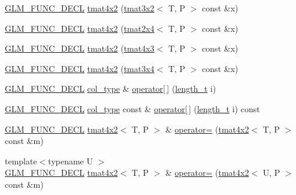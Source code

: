 \begin{DoxyCompactItemize}
\item 
\hyperlink{setup_8hpp_ab2d052de21a70539923e9bcbf6e83a51}{G\+L\+M\+\_\+\+F\+U\+N\+C\+\_\+\+D\+E\+CL} \hyperlink{structglm_1_1detail_1_1tmat4x2_adbb464ba1329c45ae931b2825114d6cf}{tmat4x2} (\hyperlink{structglm_1_1detail_1_1tmat3x2}{tmat3x2}$<$ T, P $>$ const \&x)
\item 
\hyperlink{setup_8hpp_ab2d052de21a70539923e9bcbf6e83a51}{G\+L\+M\+\_\+\+F\+U\+N\+C\+\_\+\+D\+E\+CL} \hyperlink{structglm_1_1detail_1_1tmat4x2_abfac9500ea47ed389da5d877b7b7d716}{tmat4x2} (\hyperlink{structglm_1_1detail_1_1tmat2x4}{tmat2x4}$<$ T, P $>$ const \&x)
\item 
\hyperlink{setup_8hpp_ab2d052de21a70539923e9bcbf6e83a51}{G\+L\+M\+\_\+\+F\+U\+N\+C\+\_\+\+D\+E\+CL} \hyperlink{structglm_1_1detail_1_1tmat4x2_a0f0e6e3e2d0a7bc9d9979a132c410298}{tmat4x2} (\hyperlink{structglm_1_1detail_1_1tmat4x3}{tmat4x3}$<$ T, P $>$ const \&x)
\item 
\hyperlink{setup_8hpp_ab2d052de21a70539923e9bcbf6e83a51}{G\+L\+M\+\_\+\+F\+U\+N\+C\+\_\+\+D\+E\+CL} \hyperlink{structglm_1_1detail_1_1tmat4x2_a810689bea267f9f6fc548ad4e237a2a3}{tmat4x2} (\hyperlink{structglm_1_1detail_1_1tmat3x4}{tmat3x4}$<$ T, P $>$ const \&x)
\item 
\hyperlink{setup_8hpp_ab2d052de21a70539923e9bcbf6e83a51}{G\+L\+M\+\_\+\+F\+U\+N\+C\+\_\+\+D\+E\+CL} \hyperlink{structglm_1_1detail_1_1tmat4x2_a7ff0997d9fa4f93eba8a6530ca2cd3f7}{col\+\_\+type} \& \hyperlink{structglm_1_1detail_1_1tmat4x2_a63321d20fd080a74dbd14953d339d6fc}{operator\mbox{[}$\,$\mbox{]}} (\hyperlink{namespaceglm_a090a0de2260835bee80e71a702492ed9}{length\+\_\+t} i)
\item 
\hyperlink{setup_8hpp_ab2d052de21a70539923e9bcbf6e83a51}{G\+L\+M\+\_\+\+F\+U\+N\+C\+\_\+\+D\+E\+CL} \hyperlink{structglm_1_1detail_1_1tmat4x2_a7ff0997d9fa4f93eba8a6530ca2cd3f7}{col\+\_\+type} const  \& \hyperlink{structglm_1_1detail_1_1tmat4x2_aa2d48c1cd14557209c89d0341e82074c}{operator\mbox{[}$\,$\mbox{]}} (\hyperlink{namespaceglm_a090a0de2260835bee80e71a702492ed9}{length\+\_\+t} i) const
\item 
\hyperlink{setup_8hpp_ab2d052de21a70539923e9bcbf6e83a51}{G\+L\+M\+\_\+\+F\+U\+N\+C\+\_\+\+D\+E\+CL} \hyperlink{structglm_1_1detail_1_1tmat4x2}{tmat4x2}$<$ T, P $>$ \& \hyperlink{structglm_1_1detail_1_1tmat4x2_a540bb35dcfe3e71b82c4abccca943cd2}{operator=} (\hyperlink{structglm_1_1detail_1_1tmat4x2}{tmat4x2}$<$ T, P $>$ const \&m)
\item 
{\footnotesize template$<$typename U $>$ }\\\hyperlink{setup_8hpp_ab2d052de21a70539923e9bcbf6e83a51}{G\+L\+M\+\_\+\+F\+U\+N\+C\+\_\+\+D\+E\+CL} \hyperlink{structglm_1_1detail_1_1tmat4x2}{tmat4x2}$<$ T, P $>$ \& \hyperlink{structglm_1_1detail_1_1tmat4x2_a520ecb4fc8ff7b87e517db74d07678a7}{operator=} (\hyperlink{structglm_1_1detail_1_1tmat4x2}{tmat4x2}$<$ U, P $>$ const \&m)

\end{DoxyCompactItemize}
